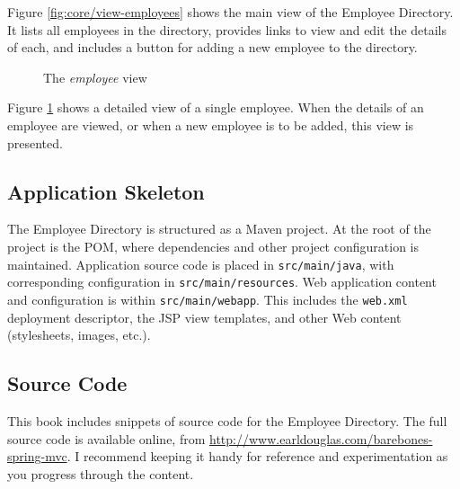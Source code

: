 \documentclass{article}
\begin{document}
Figure \ref{fig:core/view-employees} shows the main view of the Employee Directory.  It lists all employees in the directory, provides links to view and edit the details of each, and includes a button for adding a new employee to the directory.

\vspace{10pt}
\begin{figure}[H]
\begin{center}
\end{center}
\caption{The \emph{employee} view}
\label{fig:core/view-employee}
\end{figure}

Figure \ref{fig:core/view-employee} shows a detailed view of a single employee.  When the details of an employee are viewed, or when a new employee is to be added, this view is presented.

\subsection{Application Skeleton}

The Employee Directory is structured as a Maven project.  At the root of the project is the POM, where dependencies and other project configuration is maintained. Application source code is placed in \texttt{src/main/java}, with corresponding configuration in \texttt{src/main/resources}.  Web application content and configuration is within \texttt{src/main/webapp}.  This includes the \texttt{web.xml} deployment descriptor, the JSP view templates, and other Web content (stylesheets, images, etc.).

\subsection{Source Code}

This book includes snippets of source code for the Employee Directory.  The full source code is available online, from \href{http://www.earldouglas.com/barebones-spring-mvc}{http://www.earldouglas.com/barebones-spring-mvc}.  I recommend keeping it handy for reference and experimentation as you progress through the content.
\end{document}

